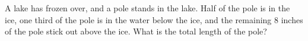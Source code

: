 A lake has frozen over, and a pole stands in the lake. Half of the pole is in the ice, one third of the pole is in the water below the ice, and the remaining $8$ inches of the pole stick out above the ice. What is the total length of the pole?

